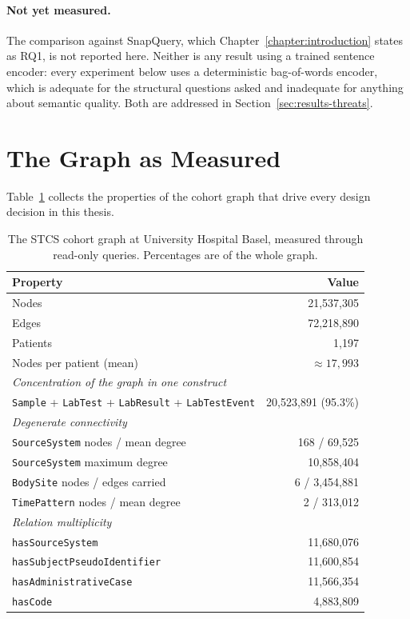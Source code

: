 \paragraph{Not yet measured.} The comparison against SnapQuery, which
Chapter~\ref{chapter:introduction} states as RQ1, is not reported here. Neither
is any result using a trained sentence encoder: every experiment below uses a
deterministic bag-of-words encoder, which is adequate for the structural
questions asked and inadequate for anything about semantic quality. Both are
addressed in Section~\ref{sec:results-threats}.

\section{The Graph as Measured} \label{sec:results-graph}

Table~\ref{tab:measured-graph} collects the properties of the cohort graph that
drive every design decision in this thesis.

\begin{table}[t]
\centering
\caption{The STCS cohort graph at University Hospital Basel, measured through
read-only queries. Percentages are of the whole graph.}
\label{tab:measured-graph}
\begin{tabular}{lr}
\toprule
Property & Value \\
\midrule
Nodes & 21{,}537{,}305 \\
Edges & 72{,}218{,}890 \\
Patients & 1{,}197 \\
Nodes per patient (mean) & $\approx 17{,}993$ \\
\midrule
\multicolumn{2}{l}{\emph{Concentration of the graph in one construct}} \\
\texttt{Sample} + \texttt{LabTest} + \texttt{LabResult} + \texttt{LabTestEvent} & 20{,}523{,}891 (95.3\%) \\
\midrule
\multicolumn{2}{l}{\emph{Degenerate connectivity}} \\
\texttt{SourceSystem} nodes / mean degree & 168 / 69{,}525 \\
\texttt{SourceSystem} maximum degree & 10{,}858{,}404 \\
\texttt{BodySite} nodes / edges carried & 6 / 3{,}454{,}881 \\
\texttt{TimePattern} nodes / mean degree & 2 / 313{,}012 \\
\midrule
\multicolumn{2}{l}{\emph{Relation multiplicity}} \\
\texttt{hasSourceSystem} & 11{,}680{,}076 \\
\texttt{hasSubjectPseudoIdentifier} & 11{,}600{,}854 \\
\texttt{hasAdministrativeCase} & 11{,}566{,}354 \\
\texttt{hasCode} & 4{,}883{,}809 \\
\bottomrule
\end{tabular}
\end{table}

